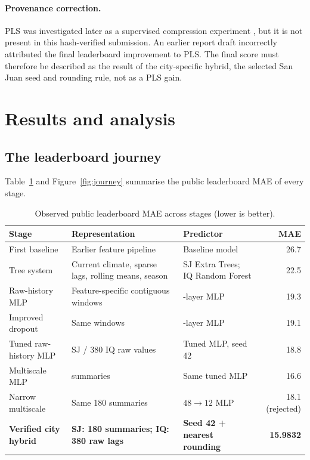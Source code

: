 \documentclass[11pt,a4paper]{article}
\begin{document}
\paragraph{Provenance correction.} PLS was investigated later as a supervised compression experiment \cite{pls}, but it is not present in this hash-verified submission. An earlier report draft incorrectly attributed the final leaderboard improvement to PLS. The final score must therefore be described as the result of the city-specific hybrid, the selected San Juan seed and rounding rule, not as a PLS gain.

\section{Results and analysis}
\subsection{The leaderboard journey}
Table~\ref{tab:journey} and Figure~\ref{fig:journey} summarise the public leaderboard MAE of every stage.

\begin{table}[H]
\centering
\caption{Observed public leaderboard MAE across stages (lower is better).}
\label{tab:journey}
\begin{tabular}{>{\raggedright\arraybackslash}p{3.8cm}>{\raggedright\arraybackslash}p{4.2cm}>{\raggedright\arraybackslash}p{3.2cm}r}
\toprule
\textbf{Stage} & \textbf{Representation} & \textbf{Predictor} & \textbf{MAE}\\
\midrule
First baseline & Earlier feature pipeline & Baseline model & 26.7\\
Tree system & Current climate, sparse lags, rolling means, season & SJ Extra Trees; IQ Random Forest & 22.5\\
Raw-history MLP & Feature-specific contiguous windows & 3-layer MLP & 19.3\\
Improved dropout & Same windows & 3-layer MLP & 19.1\\
Tuned raw-history MLP & 461 SJ / 380 IQ raw values & Tuned MLP, seed 42 & 18.8\\
Multiscale MLP & 180 summaries & Same tuned MLP & 16.6\\
Narrow multiscale & Same 180 summaries & $48\rightarrow12$ MLP & 18.1 (rejected)\\
\textbf{Verified city hybrid} & \textbf{SJ: 180 summaries; IQ: 380 raw lags} & \textbf{Seed 42 + nearest rounding} & \textbf{15.9832}\\
\bottomrule
\end{tabular}
\end{table}
\end{document}
